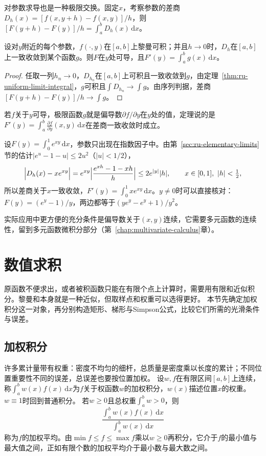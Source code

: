 对参数求导也是一种极限交换。固定$x$，考察参数的差商$D_h(x)=[f(x,y+h)-f(x,y)]/h$，则$[F(y+h)-F(y)]/h=\int_a^bD_h(x)\,\mathrm dx$。
\begin{theorem}[积分号下求导]
\label{thm:ru-differentiation-under-integral}
设对$y$附近的每个参数，$f(\cdot,y)$在$[a,b]$上黎曼可积；并且$h\to0$时，$D_h$在$[a,b]$上一致收敛到某个函数$g$。则$F$在$y$处可导，且$F'(y)=\int_a^bg(x)\,\mathrm dx$。
\end{theorem}
\begin{proof}
任取一列$h_n\to0$，$D_{h_n}$在$[a,b]$上可积且一致收敛到$g$，由定理~\ref{thm:ru-uniform-limit-integral}，$g$可积且$\int D_{h_n}\to\int g$。由序列判据，差商$[F(y+h)-F(y)]/h\to\int g$。
\end{proof}
若$f$关于$y$可导，极限函数$g$就是偏导数$\partial f/\partial y$在$y$处的值，定理说的是$F'(y)=\int_a^b\frac{\partial f}{\partial y}(x,y)\,\mathrm dx$在差商一致收敛时成立。
\begin{example}
\label{ex:ru-differentiate-exp-parametric}
设$F(y)=\int_0^1e^{xy}\,\mathrm dx$，参数只出现在指数因子中。由第~\ref{sec:ru-elementary-limits}节的估计$|e^u-1-u|\leq2u^2$（$|u|<1/2$），
\[
 \Bigl|D_h(x)-xe^{xy}\Bigr|=e^{xy}\Bigl|\frac{e^{xh}-1-xh}h\Bigr|\leq2e^{|y|}|h|,\qquad x\in[0,1],\ |h|<\tfrac12,
\]
所以差商关于$x$一致收敛，$F'(y)=\int_0^1xe^{xy}\,\mathrm dx$。$y\neq0$时可以直接核对：$F(y)=(e^y-1)/y$，两边都等于$(ye^y-e^y+1)/y^2$。
\end{example}
实际应用中更方便的充分条件是偏导数关于$(x,y)$连续，它需要多元函数的连续性，留到多元函数微积分部分（第~\ref{chap:multivariate-calculus}章）。
\section{数值求积}
\label{sec:ru-numerical-quadrature}

原函数不便求出，或者被积函数只能在有限个点上计算时，需要用有限和近似积分。黎曼和本身就是一种近似，但取样点和权重可以选得更好。
本节先确定加权积分这一对象，再分别构造矩形、梯形与Simpson公式，比较它们所需的光滑条件与误差。

\subsection{加权积分}
\label{sec:ru-weighted-integrals}

许多累计量带有权重：密度不均匀的细杆，总质量是密度乘以长度的累计；不同位置重要性不同的误差，总误差也要按位置加权。
设$w,f$在有限区间$[a,b]$上连续，称$\int_a^bw(x)f(x)\,\mathrm dx$为$f$关于权函数$w$的加权积分，$w(x)$描述位置$x$的权重。$w\equiv1$时回到普通积分。
若$w\geq0$且总权重$\int_a^bw>0$，则
\[
 \frac{\int_a^bw(x)f(x)\,\mathrm dx}{\int_a^bw(x)\,\mathrm dx}
\]
称为$f$的加权平均。由$\min f\leq f\leq\max f$乘以$w\geq0$再积分，它介于$f$的最小值与最大值之间，正如有限个数的加权平均介于最小数与最大数之间。

